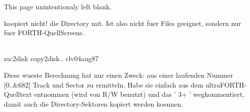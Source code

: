   This page unintentionaly left blank.   
                                         
                                         
                                         
                                         
                                         
                                         
                                         
                                         
                                         
                                         
                                         
                                         
                                         
koopiert nicht! die Directory mit.       
Ist also nicht fuer Files geeignet,      
sondern nur fuer FORTH-QuellScreens.     
                                         
                                         
                                         
                                         
                                         
                                        
\\ zu:2disk copy2disk..       clv04aug87 
                                         
                                         
Diese wueste Berechnung hat nur          
einen Zweck: aus einer laufenden         
Nummer [0..&682] Track und Sector        
zu ermitteln. Habe sie einfach           
aus dem ultraFORTH-Quelltext entnommen   
(wird von R/W benutzt) und das ' 3+ '    
wegkommentiert, damit auch die           
Directory-Sektoren kopiert werden        
koennen.                                 
                                         
                                         
                                         
                                         
                                         
                                         
                                         
                                         
                                         
                                         
                                         
